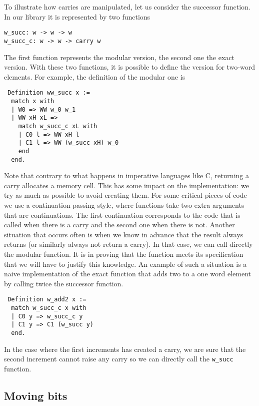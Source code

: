 To illustrate how carries are manipulated, let us consider the successor function.
In our library it is represented by two functions
\begin{verbatim}
w_succ: w -> w -> w
w_succ_c: w -> w -> carry w
\end{verbatim}
The first function represents the modular version, the second one the exact 
version. With these two functions, it is possible to define the version
for two-word elements. For example, the definition of the modular one is
\begin{verbatim}
 Definition ww_succ x :=
  match x with
  | W0 => WW w_0 w_1
  | WW xH xL =>
    match w_succ_c xL with
    | C0 l => WW xH l
    | C1 l => WW (w_succ xH) w_0
    end
  end.
\end{verbatim}
Note that contrary to what happens in imperative languages like C, returning
a carry allocates a memory cell. This has some impact on the implementation:
we try as much as possible to avoid creating them.
For some critical pieces of code we use a continuation passing style,
where functions take two extra arguments that are continuations.
The first continuation corresponds to the code that is called when there is a carry and
the second one when there is not. Another situation that occurs often is when
we know in advance that the result always returns (or similarly always not return a carry).
In that case, we can call directly the modular function. It is  in proving that the
function meets its specification that we will have to justify this knowledge.
An example of such a situation is a naive implementation of the exact function that adds two to a one
word element by calling twice the successor function.
\begin{verbatim}
 Definition w_add2 x :=
  match w_succ_c x with
  | C0 y => w_succ_c y
  | C1 y => C1 (w_succ y)
  end.
\end{verbatim}
In the case where the first increments has created a carry, we are sure that the second
increment cannot raise any carry so we can directly call the {\tt w\_succ} function.

\subsection{Moving bits}

